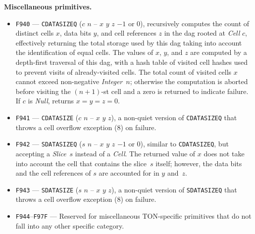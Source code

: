 \documentclass[12pt,oneside]{article}
\def\makepoint#1{\medbreak\noindent{\bf #1.\ }}
\def\nxsubpoint{\refstepcounter{subsubsection}%
  \smallbreak\makepoint{\thesubsubsection}}
\def\emb#1{\textbf{#1.}}
\begin{document}
\nxsubpoint\emb{Miscellaneous primitives}
\begin{itemize}
\item {\tt F940} --- {\tt CDATASIZEQ} ($c$ $n$ -- $x$ $y$ $z$ $-1$ or $0$), recursively computes the count of distinct cells $x$, data bits $y$, and cell references $z$ in the dag rooted at {\em Cell\/} $c$, effectively returning the total storage used by this dag taking into account the identification of equal cells. The values of $x$, $y$, and $z$ are computed by a depth-first traversal of this dag, with a hash table of visited cell hashes used to prevent visits of already-visited cells. The total count of visited cells $x$ cannot exceed non-negative {\em Integer\/}~$n$; otherwise the computation is aborted before visiting the $(n+1)$-st cell and a zero is returned to indicate failure. If $c$ is {\em Null}, returns $x=y=z=0$.
\item {\tt F941} --- {\tt CDATASIZE} ($c$ $n$ -- $x$ $y$ $z$), a non-quiet version of {\tt CDATASIZEQ} that throws a cell overflow exception (8) on failure.
\item {\tt F942} --- {\tt SDATASIZEQ} ($s$ $n$ -- $x$ $y$ $z$ $-1$ or $0$), similar to {\tt CDATASIZEQ}, but accepting a {\em Slice\/}~$s$ instead of a {\em Cell\/}. The returned value of $x$ does not take into account the cell that contains the slice~$s$ itself; however, the data bits and the cell references of $s$ are accounted for in $y$ and~$z$.
\item {\tt F943} --- {\tt SDATASIZE} ($s$ $n$ -- $x$ $y$ $z$), a non-quiet version of {\tt SDATASIZEQ} that throws a cell overflow exception (8) on failure.
\item {\tt F944}--{\tt F97F} --- Reserved for miscellaneous TON-specific primitives that do not fall into any other specific category.
\end{itemize}
\end{document}
